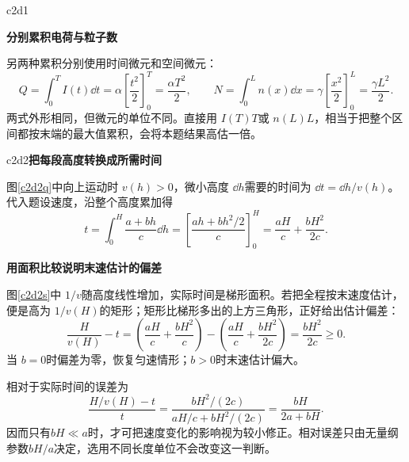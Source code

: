 \begin{drillsolution}{c2d1}
\par\medskip{}\noindent\textbf{分别累积电荷与粒子数}\par\nobreak
另两种累积分别使用时间微元和空间微元：
\[Q=\int_0^T I(t)\dd t=\alpha\left[\frac{t^2}2\right]_0^T
 =\frac{\alpha T^2}2,\qquad
N=\int_0^L n(x)\dd x=\gamma\left[\frac{x^2}2\right]_0^L
 =\frac{\gamma L^2}2.\]
两式外形相同，但微元的单位不同。直接用 $I(T)T$或 $n(L)L$，相当于把整个区间都按末端的最大值累积，会将本题结果高估一倍。
\end{drillsolution}
\begin{drillsolution}{c2d2}\textbf{把每段高度转换成所需时间}\par\nobreak
图\ref{c2d2q}中向上运动时 $v(h)>0$，微小高度 $\dd h$需要的时间为 $\dd t=\dd h/v(h)$。代入题设速度，沿整个高度累加得
\[t=\int_0^H\frac{a+bh}{c}\dd h
 =\left[\frac{ah+bh^2/2}{c}\right]_0^H
 =\boxed{\frac{aH}{c}+\frac{bH^2}{2c}}.\]



\par\medskip{}\noindent\textbf{用面积比较说明末速估计的偏差}\par\nobreak
图\ref{c2d2s}中 $1/v$随高度线性增加，实际时间是梯形面积。若把全程按末速度估计，便是高为 $1/v(H)$的矩形；矩形比梯形多出的上方三角形，正好给出估计偏差：
\[\frac H{v(H)}-t
 =\left(\frac{aH}{c}+\frac{bH^2}{c}\right)
 -\left(\frac{aH}{c}+\frac{bH^2}{2c}\right)
 =\frac{bH^2}{2c}\ge0.\]
当 $b=0$时偏差为零，恢复匀速情形；$b>0$时末速估计偏大。

相对于实际时间的误差为
\[
\frac{H/v(H)-t}{t}
=\frac{bH^2/(2c)}{aH/c+bH^2/(2c)}
=\frac{bH}{2a+bH}.
\]
因而只有$bH\ll a$时，才可把速度变化的影响视为较小修正。相对误差只由无量纲参数$bH/a$决定，选用不同长度单位不会改变这一判断。
\end{drillsolution}
